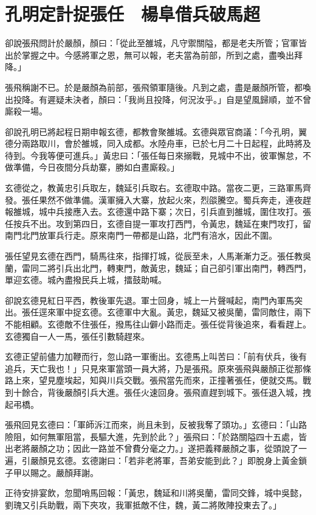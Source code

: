 
\chapter{孔明定計捉張任　楊阜借兵破馬超}

卻說張飛問計於嚴顏，顏曰：「從此至雒城，凡守禦關隘，都是老夫所管；官軍皆出於掌握之中。今感將軍之恩，無可以報，老夫當為前部，所到之處，盡喚出拜降。」

張飛稱謝不已。於是嚴顏為前部，張飛領軍隨後。凡到之處，盡是嚴顏所管，都喚出投降。有遲疑未決者，顏曰：「我尚且投降，何況汝乎。」自是望風歸順，並不曾廝殺一場。

卻說孔明已將起程日期申報玄德，都教會聚雒城。玄德與眾官商議：「今孔明，翼德分兩路取川，會於雒城，同入成都。水陸舟車，已於七月二十日起程，此時將及待到。今我等便可進兵。」黃忠曰：「張任每日來搦戰，見城中不出，彼軍懈怠，不做準備，今日夜間分兵劫寨，勝如白晝廝殺。」

玄德從之，教黃忠引兵取左，魏延引兵取右。玄德取中路。當夜二更，三路軍馬齊發。張任果然不做準備。漢軍擁入大寨，放起火來，烈燄騰空。蜀兵奔走，連夜趕報雒城，城中兵接應入去。玄德還中路下寨；次日，引兵直到雒城，圍住攻打。張任按兵不出。攻到第四日，玄德自提一軍攻打西門，令黃忠，魏延在東門攻打，留南門北門放軍兵行走。原來南門一帶都是山路，北門有涪水，因此不圍。

張任望見玄德在西門，騎馬往來，指揮打城，從辰至未，人馬漸漸力乏。張任教吳蘭，雷同二將引兵出北門，轉東門，敵黃忠，魏延；自己卻引軍出南門，轉西門，單迎玄德。城內盡撥民兵上城，擂鼓助喊。

卻說玄德見紅日平西，教後軍先退。軍士回身，城上一片聲喊起，南門內軍馬突出。張任逕來軍中捉玄德。玄德軍中大亂。黃忠，魏延又被吳蘭，雷同敵住，兩下不能相顧。玄德敵不住張任，撥馬往山僻小路而走。張任從背後追來，看看趕上。玄德獨自一人一馬，張任引數騎趕來。

玄德正望前儘力加鞭而行，忽山路一軍衝出。玄德馬上叫苦曰：「前有伏兵，後有追兵，天亡我也！」只見來軍當頭一員大將，乃是張飛。原來張飛與嚴顏正從那條路上來，望見塵埃起，知與川兵交戰。張飛當先而來，正撞著張任，便就交馬。戰到十餘合，背後嚴顏引兵大進。張任火速回身。張飛直趕到城下。張任退入城，拽起弔橋。

張飛回見玄德曰：「軍師泝江而來，尚且未到，反被我奪了頭功。」玄德曰：「山路險阻，如何無軍阻當，長驅大進，先到於此？」張飛曰：「於路關隘四十五處，皆出老將嚴顏之功；因此一路並不曾費分毫之力。」遂把義釋嚴顏之事，從頭說了一遍，引嚴顏見玄德。玄德謝曰：「若非老將軍，吾弟安能到此？」即脫身上黃金鎖子甲以賜之。嚴顏拜謝。

正待安排宴飲，忽聞哨馬回報：「黃忠，魏延和川將吳蘭，雷同交鋒，城中吳懿，劉瑰又引兵助戰，兩下夾攻，我軍抵敵不住，魏，黃二將敗陣投東去了。」

